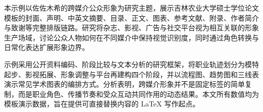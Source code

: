 
本示例以佐佐木希的跨媒介公众形象为研究主题，展示吉林农业大学硕士学位论文模板的封面、声明、中英文摘要、目录、正文、图表、参考文献、附录、作者简介与致谢等完整排版链路。研究将杂志、影视、广告与社交平台视为相互关联的形象生产场域，讨论公众人物如何在不同媒介中保持视觉识别度，同时通过角色转换与日常化表达扩展形象边界。

示例采用公开资料编码、阶段比较与文本分析的研究框架，将职业轨迹划分为模特起步、影视拓展、形象调整与平台再建构四个阶段，并以流程图、趋势图和三线表演示常见学术图表的编排方式。分析表明，跨媒介形象并不是固定标签的简单复制，而是职业角色、传播节奏和受众互动共同作用的动态结果。本文所有数值均为模板演示数据，旨在提供可直接替换内容的 LaTeX 写作起点。

\jlauKeywordsZhLine
